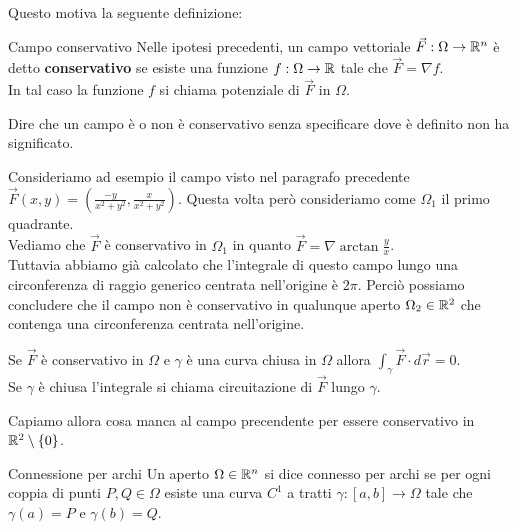 Questo motiva la seguente definizione:
\begin{definizione}{Campo conservativo}
  Nelle ipotesi precedenti, un campo vettoriale $\vec F: \Omega \rightarrow \mathbb{R}^n$ è detto \textbf{conservativo} se esiste una funzione $f: \Omega \rightarrow \mathbb{R}$ tale che $\vec F = \nabla f$. \\ In tal caso la funzione $f$ si chiama potenziale di $\vec F$ in $\Omega$.
\end{definizione}

\begin{osservazione}{}
  Dire che un campo è o non è conservativo senza specificare dove è definito non ha significato.\\
\end{osservazione}

Consideriamo ad esempio il campo visto nel paragrafo precedente $\vec F(x,y) = (\frac{-y}{x^2+y^2}, \frac{x}{x^2+y^2})$. Questa volta però consideriamo come $\Omega_1$ il primo quadrante.\\
Vediamo che $\vec F$ è conservativo in $\Omega_1$ in quanto $\vec F = \nabla \arctan \frac{y}{x}$.\\
Tuttavia abbiamo già calcolato che l'integrale di questo campo lungo una circonferenza di raggio generico centrata nell'origine è $2\pi$. Perciò possiamo concludere che il campo non è conservativo in qualunque aperto $\Omega_2 \in \mathbb{R}^2$ che contenga una circonferenza centrata nell'origine.\\

\begin{osservazione}{}
  Se $\vec F$ è conservativo in $\Omega$ e $\gamma$ è una curva chiusa in $\Omega$ allora $\int_\gamma \vec F \cdot d\vec r = 0$.\\
  Se $\gamma$ è chiusa l'integrale si chiama circuitazione di $\vec F$ lungo $\gamma$.
\end{osservazione}

Capiamo allora cosa manca al campo precendente per essere conservativo in $\mathbb{R}^2 \setminus \{0\}$.\\

\begin{definizione}{Connessione per archi}
  Un aperto $\Omega \in \mathbb{R}^n$ si dice connesso per archi se per ogni coppia di punti $P,Q \in \Omega$ esiste una curva $C^1$ a tratti $\gamma: [a,b] \rightarrow \Omega$ tale che $\gamma(a) = P$ e $\gamma(b) = Q$.
\end{definizione}

